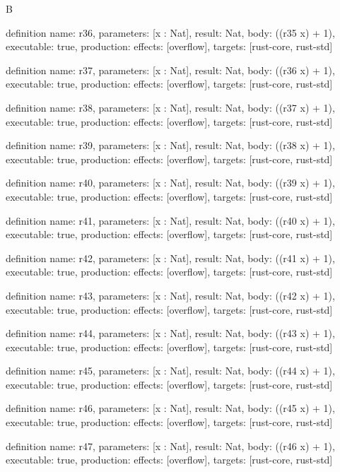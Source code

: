 \begin{lexlean}{B}
\begin{semanticmodule}
definition{
  name: r36,
  parameters: [x : Nat],
  result: Nat,
  body: ((r35 x) + 1),
  executable: true,
  production: {effects: [overflow], targets: [rust-core, rust-std]}
}

definition{
  name: r37,
  parameters: [x : Nat],
  result: Nat,
  body: ((r36 x) + 1),
  executable: true,
  production: {effects: [overflow], targets: [rust-core, rust-std]}
}

definition{
  name: r38,
  parameters: [x : Nat],
  result: Nat,
  body: ((r37 x) + 1),
  executable: true,
  production: {effects: [overflow], targets: [rust-core, rust-std]}
}

definition{
  name: r39,
  parameters: [x : Nat],
  result: Nat,
  body: ((r38 x) + 1),
  executable: true,
  production: {effects: [overflow], targets: [rust-core, rust-std]}
}

definition{
  name: r40,
  parameters: [x : Nat],
  result: Nat,
  body: ((r39 x) + 1),
  executable: true,
  production: {effects: [overflow], targets: [rust-core, rust-std]}
}

definition{
  name: r41,
  parameters: [x : Nat],
  result: Nat,
  body: ((r40 x) + 1),
  executable: true,
  production: {effects: [overflow], targets: [rust-core, rust-std]}
}

definition{
  name: r42,
  parameters: [x : Nat],
  result: Nat,
  body: ((r41 x) + 1),
  executable: true,
  production: {effects: [overflow], targets: [rust-core, rust-std]}
}

definition{
  name: r43,
  parameters: [x : Nat],
  result: Nat,
  body: ((r42 x) + 1),
  executable: true,
  production: {effects: [overflow], targets: [rust-core, rust-std]}
}

definition{
  name: r44,
  parameters: [x : Nat],
  result: Nat,
  body: ((r43 x) + 1),
  executable: true,
  production: {effects: [overflow], targets: [rust-core, rust-std]}
}

definition{
  name: r45,
  parameters: [x : Nat],
  result: Nat,
  body: ((r44 x) + 1),
  executable: true,
  production: {effects: [overflow], targets: [rust-core, rust-std]}
}

definition{
  name: r46,
  parameters: [x : Nat],
  result: Nat,
  body: ((r45 x) + 1),
  executable: true,
  production: {effects: [overflow], targets: [rust-core, rust-std]}
}

definition{
  name: r47,
  parameters: [x : Nat],
  result: Nat,
  body: ((r46 x) + 1),
  executable: true,
  production: {effects: [overflow], targets: [rust-core, rust-std]}
}


\end{semanticmodule}
\end{lexlean}
